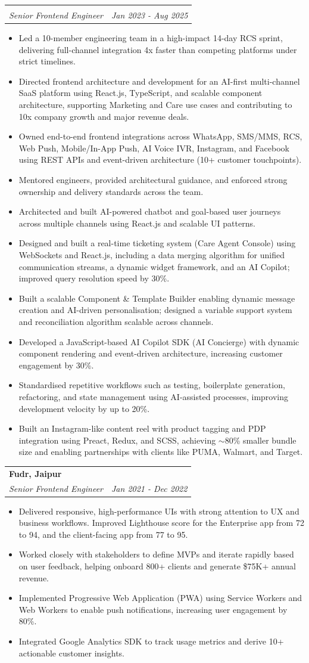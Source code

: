 \documentclass[letterpaper,11pt]{article}
\makeatletter
\newcommand{\resumeItem}[1]{\item \small{#1}}
\newcommand{\resumeSubheading}[4]{
  \vspace{-2pt}\item
  \begin{tabular*}{0.97\textwidth}[t]{l@{\extracolsep{\fill}}r}
    \textbf{#1} & #2 \\
    \textit{\small#3} & \textit{\small #4} \\
  \end{tabular*}\vspace{-6pt}
}
\newcommand{\resumeItemListStart}{\begin{itemize}[leftmargin=0.2in, label=\textbullet]}
\newcommand{\resumeItemListEnd}{\end{itemize}\vspace{-5pt}}
\makeatother
\begin{document}
\resumeSubheading
{}{ }{Senior Frontend Engineer}{Jan 2023 - Aug 2025}
\resumeItemListStart
\resumeItem{Led a 10-member engineering team in a high-impact 14-day RCS sprint, delivering full-channel integration 4x faster than competing platforms under strict timelines.}
\resumeItem{Directed frontend architecture and development for an AI-first multi-channel SaaS platform using React.js, TypeScript, and scalable component architecture, supporting Marketing and Care use cases and contributing to 10x company growth and major revenue deals.}
\resumeItem{Owned end-to-end frontend integrations across WhatsApp, SMS/MMS, RCS, Web Push, Mobile/In-App Push, AI Voice IVR, Instagram, and Facebook using REST APIs and event-driven architecture (10+ customer touchpoints).}
\resumeItem{Mentored engineers, provided architectural guidance, and enforced strong ownership and delivery standards across the team.}
\resumeItem{Architected and built AI-powered chatbot and goal-based user journeys across multiple channels using React.js and scalable UI patterns.}
\resumeItem{Designed and built a real-time ticketing system (Care Agent Console) using WebSockets and React.js, including a data merging algorithm for unified communication streams, a dynamic widget framework, and an AI Copilot; improved query resolution speed by 30\%.}
\resumeItem{Built a scalable Component \& Template Builder enabling dynamic message creation and AI-driven personalisation; designed a variable support system and reconciliation algorithm scalable across channels.}
\resumeItem{Developed a JavaScript-based AI Copilot SDK (AI Concierge) with dynamic component rendering and event-driven architecture, increasing customer engagement by 30\%.}
\resumeItem{Standardised repetitive workflows such as testing, boilerplate generation, refactoring, and state management using AI-assisted processes, improving development velocity by up to 20\%.}
\resumeItem{Built an Instagram-like content reel with product tagging and PDP integration using Preact, Redux, and SCSS, achieving $\sim$80\% smaller bundle size and enabling partnerships with clients like PUMA, Walmart, and Target.}
\resumeItemListEnd

\resumeSubheading
{Fudr, Jaipur}{}{Senior Frontend Engineer}{Jan 2021 - Dec 2022}
\resumeItemListStart
\resumeItem{Delivered responsive, high-performance UIs with strong attention to UX and business workflows. Improved Lighthouse score for the Enterprise app from 72 to 94, and the client-facing app from 77 to 95.}
\resumeItem{Worked closely with stakeholders to define MVPs and iterate rapidly based on user feedback, helping onboard 800+ clients and generate \$75K+ annual revenue.}
\resumeItem{Implemented Progressive Web Application (PWA) using Service Workers and Web Workers to enable push notifications, increasing user engagement by 80\%.}
\resumeItem{Integrated Google Analytics SDK to track usage metrics and derive 10+ actionable customer insights.}
\resumeItemListEnd
\end{document}
